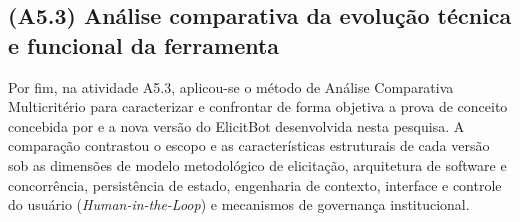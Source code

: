 \subsection{(A5.3) Análise comparativa da evolução técnica e funcional da ferramenta}

Por fim, na atividade A5.3, aplicou-se o método de Análise Comparativa Multicritério para caracterizar e confrontar de forma objetiva a prova de conceito concebida por  e a nova versão do ElicitBot desenvolvida nesta pesquisa. A comparação contrastou o escopo e as características estruturais de cada versão sob as dimensões de modelo metodológico de elicitação, arquitetura de software e concorrência, persistência de estado, engenharia de contexto, interface e controle do usuário (\textit{Human-in-the-Loop}) e mecanismos de governança institucional.